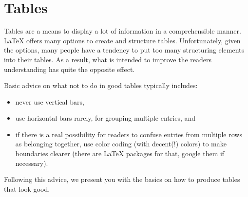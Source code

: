 \section{Tables}
\label{sec:guide:tables}

Tables are a means to display a lot of information in a comprehensible manner.
\LaTeX{} offers many options to create and structure tables.
Unfortunately, given the options, many people have a tendency to put too many
structuring elements into their tables.
As a result, what is intended to improve the readers understanding has quite
the opposite effect.

Basic advice on what not to do in good tables typically includes:
\begin{itemize}
	\item never use vertical bars,
	\item use horizontal bars rarely, \eg{} for grouping multiple entries,
	and
	\item if there is a real possibility for readers to confuse entries from
	multiple rows as belonging together, use color coding (with decent(!)
	colors) to make boundaries clearer (there are \LaTeX{} packages for
	that, google them if necessary).
\end{itemize}
Following this advice, we present you with the basics on how to produce tables
that look good.

